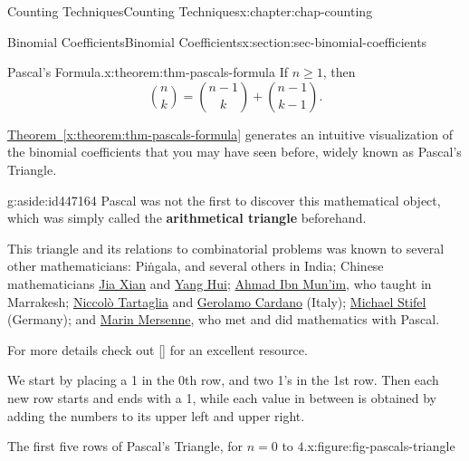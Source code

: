 \documentclass[oneside,10pt,]{book}
\newcommand{\xreffont}{\relax}
\newcommand{\terminology}[1]{\textbf{#1}}
\numberwithin{equation}{section}
\begin{document}
\begin{chapterptx}{Counting Techniques}{}{Counting Techniques}{}{}{x:chapter:chap-counting}
\begin{sectionptx}{Binomial Coefficients}{}{Binomial Coefficients}{}{}{x:section:sec-binomial-coefficients}
\begin{theorem}{Pascal's Formula.}{}{x:theorem:thm-pascals-formula}%
If \(n \geq 1\), then%
\begin{equation*}
\binom{n}{k} = \binom{n-1}{k} + \binom{n-1}{k-1}\text{.}
\end{equation*}
%
\end{theorem}
\hyperref[x:theorem:thm-pascals-formula]{Theorem~{\xreffont\ref{x:theorem:thm-pascals-formula}}} generates an intuitive visualization of the binomial coefficients that you may have seen before, widely known as Pascal's Triangle.%
\begin{aside}{}{g:aside:id447164}%
Pascal was not the first to discover this mathematical object, which was simply called the \terminology{arithmetical triangle} beforehand.%
\par
This triangle and its relations to combinatorial problems was known to several other mathematicians: Piṅgala, and several others in India; Chinese mathematicians \href{https://en.wikipedia.org/wiki/Jia_Xian}{Jia Xian} and \href{https://en.wikipedia.org/wiki/Yang_Hui}{Yang Hui}; \href{https://en.wikipedia.org/wiki/Ahmad_ibn_Munim_al-Abdari}{Ahmad Ibn Mun'im}, who taught in Marrakesh; \href{https://en.wikipedia.org/wiki/Niccol\%C3\%B2_Fontana_Tartaglia}{Niccolò Tartaglia} and \href{https://en.wikipedia.org/wiki/Gerolamo_Cardano}{Gerolamo Cardano} (Italy); \href{https://en.wikipedia.org/wiki/Michael_Stifel}{Michael Stifel} (Germany); and \href{https://en.wikipedia.org/wiki/Marin_Mersenne}{Marin Mersenne}, who met and did mathematics with Pascal.%
\par
For more details check out \hyperlink{x:biblio:bib-wilson-2013}{[{\xreffont 6}]} for an excellent resource.%
\end{aside}
We start by placing a 1 in the 0th row, and two 1's in the 1st row. Then each new row starts and ends with a 1, while each value in between is obtained by adding the numbers to its upper left and upper right.%
\begin{figureptx}{The first five rows of Pascal's Triangle, for \(n = 0\) to \(4\).}{x:figure:fig-pascals-triangle}{}%
\begin{image}{0.3}{0.4}{0.3}%
\end{image}
\end{figureptx}
\end{sectionptx}
\end{chapterptx}
\end{document}
